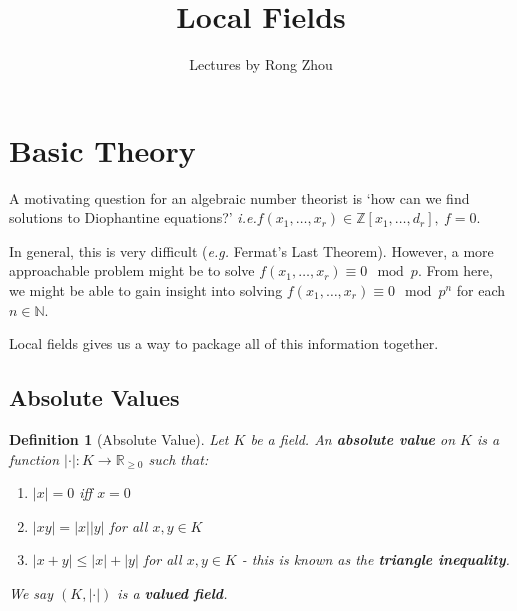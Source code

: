 \documentclass[]{article}
\title{Local Fields}
\author{Lectures by Rong Zhou}
\date{}
\theoremstyle{custhm}
\theoremstyle{cusdef}
\newtheorem{defin}[theorem]{Definition}
\theoremstyle{custhm}
\theoremstyle{custhm}
\theoremstyle{custhm}
\theoremstyle{custhm}
\theoremstyle{cusdef}
\theoremstyle{remark}
\newcommand{\N}{\mathbb{N}}
\newcommand{\Z}{\mathbb{Z}}
\newcommand{\R}{\mathbb{R}}
\newcommand{\ra}{\rightarrow}
\newcommand{\ie}{\textit{i.e.}}
\newcommand{\undf}[1]{\textit{\textbf{#1}}}
\renewcommand{\it}[1]{\textit{#1}}
\begin{document}
\maketitle
\clearpage
\tableofcontents
\clearpage

\section{Basic Theory}

A motivating question for an algebraic number theorist is `how can we find solutions to Diophantine equations?' \ie $f(x_1,\dots,x_r)\in \Z[x_1,\dots,d_r],\ f = 0$.

In general, this is very difficult (\it{e.g.} Fermat's Last Theorem). However, a more approachable problem might be to solve $f(x_1,\dots,x_r)\equiv 0 \mod p$. From here, we might be able to gain insight into solving $f(x_1,\dots,x_r)\equiv 0\mod p^n$ for each $n\in\N$.

Local fields gives us a way to package all of this information together.

\subsection{Absolute Values}

\begin{defin}[Absolute Value]
	Let $K$ be a field. An \undf{absolute value} on $K$ is a function $|\cdot|:K\ra\R_{\ge0}$ such that:
	\begin{enumerate}[label = (\roman*)]
		\item $|x| = 0$ iff $x= 0$
		\item $|xy| = |x||y|$ for all $x,y\in K$
		\item $|x+y| \le |x| + |y|$ for all $x,y\in K$ - this is known as the \undf{triangle inequality}.
	\end{enumerate}

We say $(K,|\cdot|)$ is a \undf{valued field}.
\end{defin}
\end{document}
